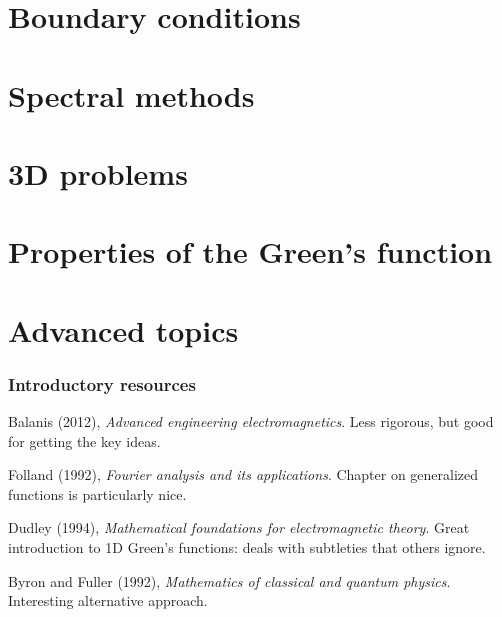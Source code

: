 \documentclass[12 pt, compress, handout, intlimits]{beamer}
\begin{document}

\section{Boundary conditions}
\label{sec:boundary_conditions}

\note{
}

\section{Spectral methods}
\label{sec:spectral_methods}

\note{}

\section{3D problems}
\label{sec:3d_problems}

\note{}

\section{Properties of the Green's function}
\label{sec:properties_of_the_green_s_function}

\note{}

\section{Advanced topics}
\label{sec:advanced_topics}

\note{}


\begin{frame}[fragile]
    \frametitle{Introductory resources}
    Balanis (2012), \emph{Advanced engineering electromagnetics}. 
    Less rigorous, but good for getting the key ideas.

    Folland (1992), \emph{Fourier analysis and its applications}. 
    Chapter on generalized functions is particularly nice.

    Dudley (1994), \emph{Mathematical foundations for electromagnetic theory}.
    Great introduction to 1D Green's functions: deals with subtleties that others ignore.

    Byron and Fuller (1992), \emph{Mathematics of classical and quantum physics}.
    Interesting alternative approach.
    
\end{frame}
\end{document}
